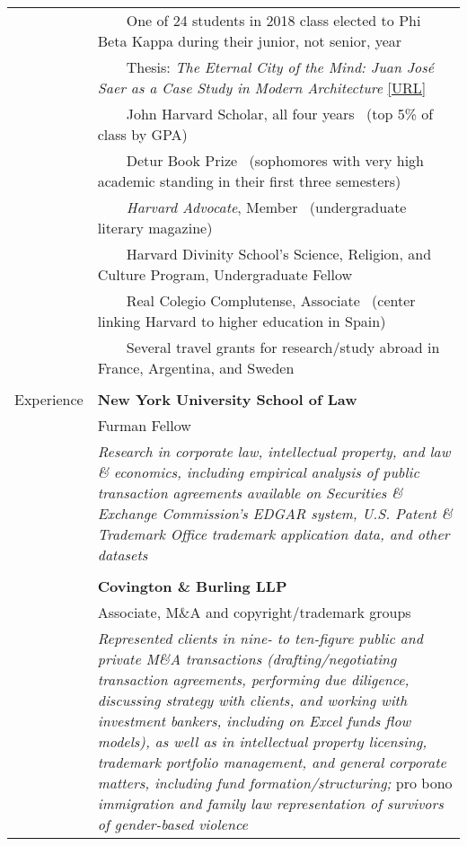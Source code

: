 \documentclass[a4paper,11pt,oneside]{article}
\newcommand{\years}[1]{\marginnote{\scriptsize #1}}
\newcommand{\tabitem}{~~\llap{\footnotesize{\textbullet}}~~}
\newcommand{\raum}{\vspace{1.5ex}}
\begin{document}
\begin{tabular}{@{} l l}
     & \tabitem One of 24 students in 2018 class elected to Phi Beta Kappa during their junior, not senior, year \\
     & \tabitem Thesis: \textit{The Eternal City of the Mind: Juan José Saer as a Case Study in Modern Architecture} \href{https://github.com/4casas/thesis}{[URL]} \\
     & \tabitem John Harvard Scholar, all four years \ (top 5\% of class by GPA) \\
     & \tabitem Detur Book Prize \ (sophomores with very high academic standing in their first three semesters) \\
     & \tabitem \textit{Harvard Advocate}, Member \ (undergraduate literary magazine) \\
     & \tabitem Harvard Divinity School’s Science, Religion, and Culture Program, Undergraduate Fellow \\
     & \tabitem Real Colegio Complutense, Associate \ (center linking Harvard to higher education in Spain) \\
     & \tabitem Several travel grants for research/study abroad in France, Argentina, and Sweden \\
     & \\
\large{Experience} & \small{\textbf{New York University School of Law}} \raum \\
    & \years{2024—} Furman Fellow \raum \\
    & \parbox{5.0in}{\textit{Research in corporate law, intellectual property, and law \& economics, including empirical analysis of public transaction agreements available on Securities \& Exchange Commission's EDGAR system, U.S. Patent \& Trademark Office trademark application data, and other datasets}} \\
    & \\
    & \small{\textbf{Covington \& Burling LLP}} \raum \\
    & \years{2021—2024} Associate, M\&A and copyright/trademark groups \raum \\
    & \parbox{5.0in}{\textit{Represented clients in nine- to ten-figure public and private M\&A transactions (drafting/negotiating transaction agreements, performing due diligence, discussing strategy with clients, and working with investment bankers, including on Excel funds flow models), as well as in intellectual property licensing, trademark portfolio management, and general corporate matters, including fund formation/structuring;} pro bono \textit{immigration and family law representation of survivors of gender-based violence}} \raum \\

\end{tabular}
\end{document}
